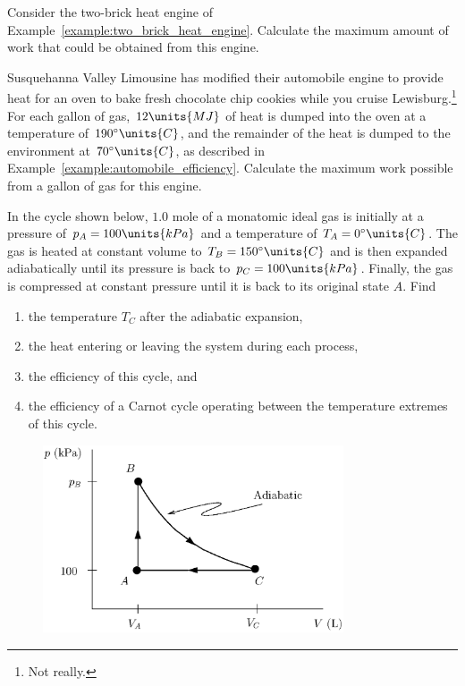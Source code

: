 \begin{problem} 
  Consider the two-brick heat engine of
  Example~\ref{example:two_brick_heat_engine}.  Calculate the maximum
  amount of work that could be obtained from this engine.
\end{problem}

\begin{problem} 
  Susquehanna Valley Limousine has modified their automobile engine to
  provide heat for an oven to bake fresh chocolate chip cookies while
  you cruise Lewisburg.\footnote{Not really.}  For each gallon of gas,
  $12\units{MJ}$ of heat is dumped into the oven at a temperature of
  $190^\circ\units{C}$, and the remainder of the heat is dumped to the
  environment at $70^\circ\units{C}$, as described in
  Example~\ref{example:automobile_efficiency}.  Calculate the maximum
  work possible from a gallon of gas for this engine.
\end{problem}

\begin{problem}  %
  In the cycle shown below, $1.0$ mole of a
  monatomic ideal gas is initially at a pressure of $p_A=100\units{kPa}$
  and a temperature of $T_A=0^\circ\units{C}$.  The gas is heated at
  constant volume to $T_B = 150^\circ\units{C}$ and is then expanded
  adiabatically until its pressure is back to $p_C=100\units{kPa}$.
  Finally, the gas is compressed at constant pressure until it is back
  to its original state $A$.  Find
  \begin{enumerate}
  \item the temperature $T_C$ after the adiabatic expansion,
  \item the heat entering or leaving the system during each process,
  \item the efficiency of this cycle, and
  \item the efficiency of a Carnot cycle operating between the
    temperature extremes of this cycle.
  \end{enumerate}
  \begin{figure}[h]
    \begin{center}
      \includegraphics[width=3.5in]{heat_engines/cycle.eps}
    \end{center}
  \end{figure}
\end{problem}

